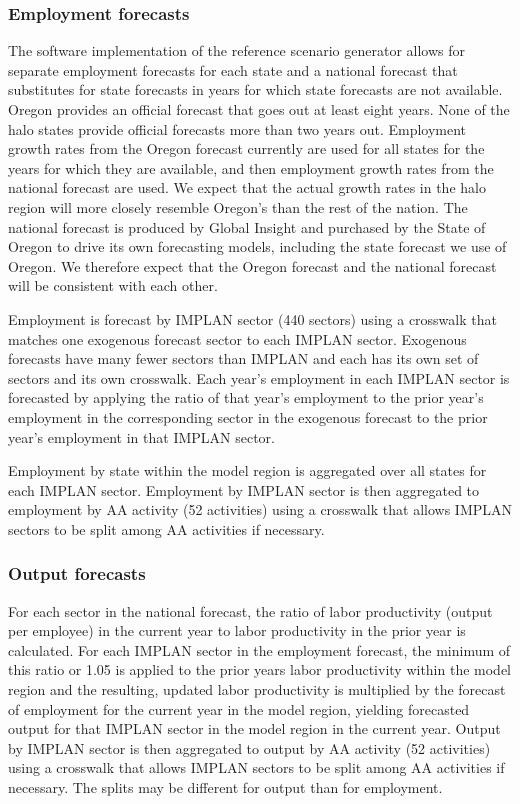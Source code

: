 \subsubsection{Employment forecasts}
The software implementation of the reference scenario generator allows for separate employment forecasts for each state and a national forecast that substitutes for state forecasts in years for which state forecasts are not available. Oregon provides an official forecast that goes out at least eight years. None of the halo states provide official forecasts more than two years out. Employment growth rates from the Oregon forecast currently are used for all states for the years for which they are available, and then employment growth rates from the national forecast are used. We expect that the actual growth rates in the halo region will more closely resemble Oregon's than the rest of the nation. The national forecast is produced by Global Insight and purchased by the State of Oregon to drive its own forecasting models, including the state forecast we use of Oregon. We therefore expect that the Oregon forecast and the national forecast will be consistent with each other.

Employment is forecast by IMPLAN sector (440 sectors) using a crosswalk that matches one exogenous forecast sector to each IMPLAN sector. Exogenous forecasts have many fewer sectors than IMPLAN and each has its own set of sectors and its own crosswalk. Each year's employment in each IMPLAN sector is forecasted by applying the ratio of that year's employment to the prior year's employment in the corresponding sector in the exogenous forecast to the prior year's employment in that IMPLAN sector.

Employment by state within the model region is aggregated over all states for each IMPLAN sector. Employment by IMPLAN sector is then aggregated to employment by AA activity (52 activities) using a crosswalk that allows IMPLAN sectors to be split among AA activities if necessary. 

\subsubsection{Output forecasts}
For each sector in the national forecast, the ratio of labor productivity (output per employee) in the current year to labor productivity in the prior year is calculated. For each IMPLAN sector in the employment forecast, the minimum of this ratio or 1.05 is applied to the prior years labor productivity within the model region and the resulting, updated labor productivity is multiplied by the forecast of employment for the current year in the model region, yielding forecasted output for that IMPLAN sector in the model region in the current year. 
Output by IMPLAN sector is then aggregated to output by AA activity (52 activities) using a crosswalk that allows IMPLAN sectors to be split among AA activities if necessary. The splits may be different for output than for employment.

